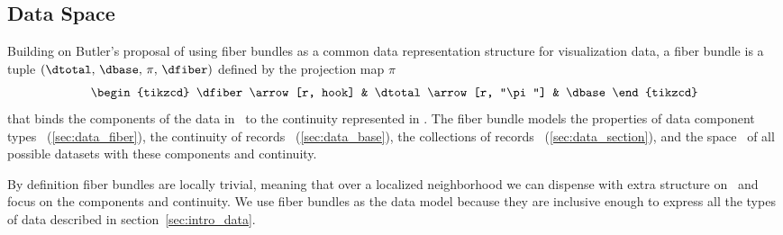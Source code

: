 \documentclass[../main.tex]{subfiles}
\begin{document}
\subsection{Data Space \dtotal}
\label{sec:data}
Building on Butler's proposal of using fiber bundles as a common data representation structure for visualization data\cite{butlerVectorBundleClassesForm1992, butlerVisualizationModelBased1989}, a fiber bundle is a tuple $(\dtotal,\,\dbase,\,\pi ,\,\dfiber)$ defined by the projection map $\pi$
\begin{equation}
    \label{eq:fiber_bundle}
    \begin{tikzcd}
        \dfiber \arrow[r, hook] & \dtotal \arrow[r, "\pi"] & \dbase
    \end{tikzcd}
\end{equation}
that binds the components of the data in \dfiber\ to the continuity represented in \dbase. The fiber bundle models the properties of data component types \dfiber\ (\ref{sec:data_fiber}), the continuity of records \dbase\ (\ref{sec:data_base}), the collections of records \dsection\ (\ref{sec:data_section}), and the space \dtotal\ of all possible datasets with these components and continuity. 

By definition fiber bundles are locally trivial\cite{spanier1989algebraic,LocallyTrivialFibre}, meaning that over a localized neighborhood we can dispense with extra structure on \dtotal\ and focus on the components and continuity. We use fiber bundles as the data model because they are inclusive enough to express all the types of data described in section~\ref{sec:intro_data}. 
\end{document}
